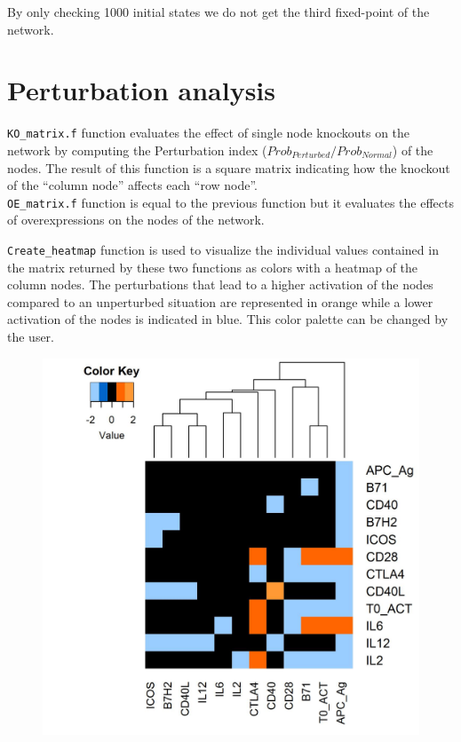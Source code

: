 \documentclass[a4paper]{article}
\begin{document}
By only checking 1000 initial states we do not get the third fixed-point of the network.
\section{Perturbation analysis}
\texttt{KO\_matrix.f} function evaluates the effect of single node knockouts on the network by computing the Perturbation index ($Prob_{Perturbed} / Prob_{Normal}$) of the nodes. The result of this function is a square matrix indicating how the knockout of the ``column node'' affects each ``row node''.\\
\texttt{OE\_matrix.f} function is equal to the previous function but it evaluates the effects of overexpressions on the nodes of the network.

\texttt{Create\_heatmap} function is used to visualize the individual values contained in the matrix returned by these two functions as colors with a heatmap of the column nodes. The perturbations that lead to a higher activation of the nodes compared to an unperturbed situation are represented in orange while a lower activation of the nodes is indicated in blue. This color palette can be changed by the user.


\begin{Schunk}
\end{Schunk}
\begin{figure}[!htbp]
\centerline{\includegraphics{heatmap.jpg}}
\end{figure}
\end{document}

